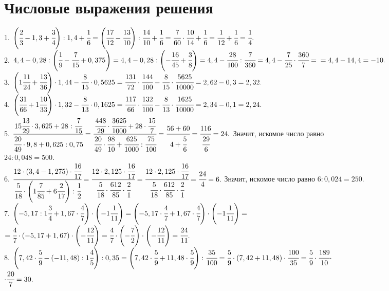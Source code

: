 \documentclass[12pt]{article}
\begin{document}
\section{Числовые выражения решения}
1. $\left(\cfrac{2}{3}-1,3+\cfrac{3}{4}\right):1,4+\cfrac{1}{6}=\left(\cfrac{17}{12}-\cfrac{13}{10}\right):\cfrac{14}{10}+\cfrac{1}{6}=\cfrac{7}{60}\cdot\cfrac{10}{14}+\cfrac{1}{6}=
\cfrac{1}{12}+\cfrac{1}{6}=\cfrac{1}{4}.$\\
2. $4,4-0,28:\left(\cfrac{1}{9}-\cfrac{7}{15}+0,375\right)=4,4-0,28:\left(-\cfrac{16}{45}+\cfrac{3}{8}\right)=4,4-\cfrac{28}{100}:\cfrac{7}{360}=4,4-\cfrac{7}{25}\cdot\cfrac{360}{7}=
\\=4,4-14,4=-10.$\\
3. $\left(1\cfrac{11}{24}+\cfrac{13}{36}\right)\cdot1,44-\cfrac{8}{15}\cdot0,5625=\cfrac{131}{72}\cdot\cfrac{144}{100}-\cfrac{8}{15}\cdot\cfrac{5625}{10000}=
2,62-0,3=2,32.$\\
4. $\left(\cfrac{31}{66}+1\cfrac{10}{33}\right)\cdot1,32-\cfrac{8}{13}\cdot0,1625=\cfrac{117}{66}\cdot\cfrac{132}{100}-\cfrac{8}{13}\cdot\cfrac{1625}{10000}=
2,34-0,1=2,24.$\\
5. $\cfrac{15\cfrac{13}{29}\cdot3,625+28:\cfrac{7}{15}}{\cfrac{20}{49}\cdot9,8+0,625:0,75}=\cfrac{\cfrac{448}{29}\cdot\cfrac{3625}{1000}+28\cdot\cfrac{15}{7}}{\cfrac{20}{49}\cdot\cfrac{98}{10}+\cfrac{625}{1000}:\cfrac{75}{100}}=
\cfrac{56+60}{4+\cfrac{5}{6}}=\cfrac{116}{\cfrac{29}{6}}=24.$ Значит, искомое число равно \\$24:0,048=500.$\\
6. $\cfrac{12\cdot(3,4-1,275)\cdot\cfrac{16}{17}}{\cfrac{5}{18}\cdot\left(1\cfrac{7}{85}
+6\cfrac{2}{17}\right):\cfrac{1}{2}}=\cfrac{12\cdot2,125\cdot\cfrac{16}{17}}{\cfrac{5}{18}\cdot\cfrac{612}{85}\cdot\cfrac{2}{1}}=
\cfrac{12\cdot2,125\cdot\cfrac{16}{17}}{\cfrac{5}{18}\cdot\cfrac{612}{85}\cdot\cfrac{2}{1}}=\cfrac{24}{4}=6.$ Значит, искомое число равно $6:0,024=250.$\\
7. $\left(-5,17:1\cfrac{3}{4}+1,67\cdot\cfrac{4}{7}\right)\cdot\left(-1\cfrac{1}{11}\right)=\left(-5,17\cdot\cfrac{4}{7}+1,67\cdot\cfrac{4}{7}\right)\cdot\left(-1\cfrac{1}{11}\right)=$\\
$=\cfrac{4}{7}\cdot\left(-5,17+1,67\right)\cdot\left(-\cfrac{12}{11}\right)=\cfrac{4}{7}\cdot\left(-\cfrac{7}{2}\right)\cdot\left(-\cfrac{12}{11}\right)=\cfrac{24}{11}.$\\
8. $\left(7,42\cdot\cfrac{5}{9}-(-11,48):1\cfrac{4}{5}\right):0,35=\left(7,42\cdot\cfrac{5}{9}+11,48\cdot\cfrac{5}{9}\right):\cfrac{35}{100}=
\cfrac{5}{9}\cdot\left(7,42+11,48\right)\cdot\cfrac{100}{35}=\cfrac{5}{9}\cdot\cfrac{189}{10}\cdot$\\$\cdot\cfrac{20}{7}=30.$\\
\end{document}
